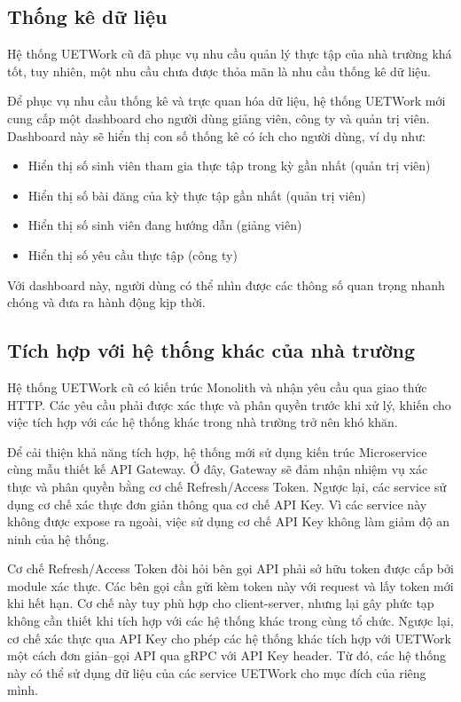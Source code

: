 \documentclass[./../main.tex]{subfiles}
\begin{document}
\hypertarget{thux1ed1ng-kuxea-dux1eef-liux1ec7u}{%
	\subsection{Thống kê dữ
		liệu}\label{thux1ed1ng-kuxea-dux1eef-liux1ec7u}}

Hệ thống UETWork cũ đã phục vụ nhu cầu quản lý thực tập của nhà trường khá tốt, tuy nhiên, một nhu cầu chưa được thỏa mãn là nhu cầu thống kê dữ liệu.

Để phục vụ nhu cầu thống kê và trực quan hóa dữ liệu, hệ thống UETWork mới cung cấp một dashboard cho người dùng giảng viên, công ty và quản trị viên. Dashboard này sẽ hiển thị con số thống kê có ích cho người dùng, ví dụ như:

\begin{itemize}
	\item

	      Hiển thị số sinh viên tham gia thực tập trong kỳ gần nhất (quản trị
	      viên)

	\item

	      Hiển thị số bài đăng của kỳ thực tập gần nhất (quản trị viên)

	\item

	      Hiển thị số sinh viên đang hướng dẫn (giảng viên)

	\item

	      Hiển thị số yêu cầu thực tập (công ty)

\end{itemize}

Với dashboard này, người dùng có thể nhìn được các thông số quan trọng nhanh chóng và đưa ra hành động kịp thời.

\subsection{Tích hợp với hệ thống khác của nhà trường}

Hệ thống UETWork cũ có kiến trúc Monolith và nhận yêu cầu qua giao thức HTTP. Các yêu cầu phải được xác thực và phân quyền trước khi xử lý, khiến cho việc tích hợp với các hệ thống khác trong nhà trường trở nên khó khăn.

Để cải thiện khả năng tích hợp, hệ thống mới sử dụng kiến trúc Microservice cùng mẫu thiết kế API Gateway. Ở đây, Gateway sẽ đảm nhận nhiệm vụ xác thực và phân quyền bằng cơ chế Refresh/Access Token. Ngược lại, các service sử dụng cơ chế xác thực đơn giản thông qua cơ chế API Key. Vì các service này không được expose ra ngoài, việc sử dụng cơ chế API Key không làm giảm độ an ninh của hệ thống.

Cơ chế Refresh/Access Token đòi hỏi bên gọi API phải sở hữu token được cấp bởi module xác thực. Các bên gọi cần gửi kèm token này với request và lấy token mới khi hết hạn. Cơ chế này tuy phù hợp cho client-server, nhưng lại gây phức tạp không cần thiết khi tích hợp với các hệ thống khác trong cùng tổ chức. Ngược lại, cơ chế xác thực qua API Key cho phép các hệ thống khác tích hợp với UETWork một cách đơn giản--gọi API qua gRPC với API Key header. Từ đó, các hệ thống này có thể sử dụng dữ liệu của các service UETWork cho mục đích của riêng mình.
\end{document}
